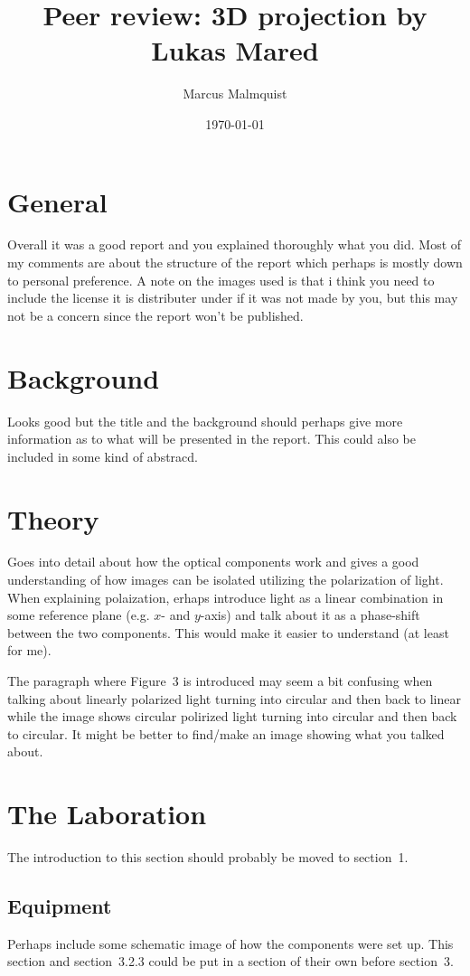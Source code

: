 \documentclass{article}
\title{Peer review: 3D projection by Lukas Mared}
\author{Marcus Malmquist}
\date{\today}
\begin{document}
\maketitle
\section{General}
Overall it was a good report and you explained thoroughly what you did. Most of my comments are about the structure of the report which perhaps is mostly down to personal preference. A note on the images used is that i think you need to include the license it is distributer under if it was not made by you, but this may not be a concern since the report won't be published.

\section{Background}
Looks good but the title and the background should perhaps give more information as to what will be presented in the report. This could also be included in some kind of abstracd.

\section{Theory}
Goes into detail about how the optical components work and gives a good understanding of how images can be isolated utilizing the polarization of light.
When explaining polaization, erhaps introduce light as a linear combination in some reference plane (e.g. $x$- and $y$-axis) and talk about it as a phase-shift between the two components. This would make it easier to understand (at least for me).

The paragraph where Figure~3 is introduced may seem a bit confusing when talking about linearly polarized light turning into circular and then back to linear while the image shows circular polirized light turning into circular and then back to circular. It might be better to find/make an image showing what you talked about.

\section{The Laboration}
The introduction to this section should probably be moved to section~1.
\subsection{Equipment}
Perhaps include some schematic image of how the components were set up. This section and section~3.2.3 could be put in a section of their own before section~3.
\end{document}
